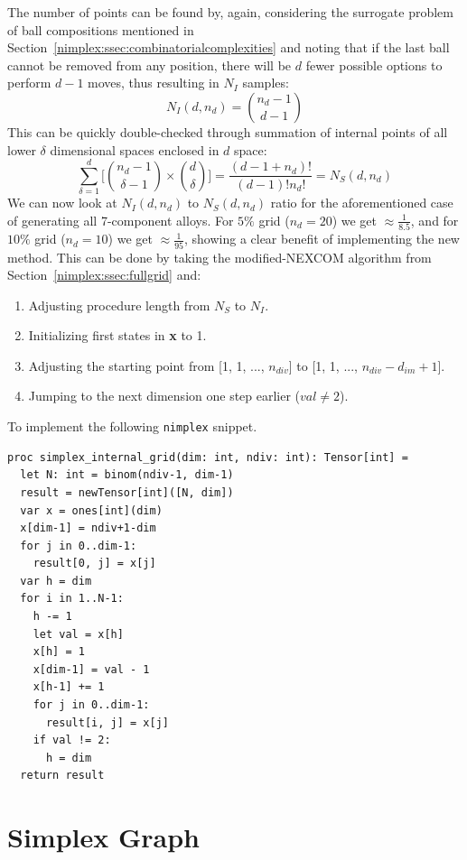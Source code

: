 The number of points can be found by, again, considering the surrogate problem of ball compositions mentioned in Section~\ref{nimplex:ssec:combinatorialcomplexities} and noting that if the last ball cannot be removed from any position, there will be $d$ fewer possible options to perform $d-1$ moves, thus resulting in $N_I$ samples:
\begin{equation}
    N_I(d, n_d) = \binom{n_d-1}{d-1}
\end{equation}
This can be quickly double-checked through summation of internal points of all lower $\delta$ dimensional spaces enclosed in $d$ space:
\[\sum_{\delta=1}^d \Biggl[ \binom{n_d-1}{\delta-1} \times \binom{d}{\delta} \Biggr] =  \frac{(d - 1 + n_d)!}{(d-1)!n_d!} = N_S(d, n_d)\]
We can now look at $N_I(d, n_d)$ to $N_S(d, n_d)$ ratio for the aforementioned case of generating all 7-component alloys. For $5\%$ grid ($n_d=20$) we get $\approx \frac{1}{8.5}$, and for $10\%$ grid ($n_d=10$) we get $\approx \frac{1}{95}$, showing a clear benefit of implementing the new method. This can be done by taking the modified-NEXCOM algorithm \cite{Chasalow1995AlgorithmPoints} from Section~\ref{nimplex:ssec:fullgrid} and:
\begin{enumerate}
    \item Adjusting procedure length from $N_S$ to $N_I$.
    \item Initializing first states in \textbf{x} to 1.
    \item Adjusting the starting point from [1, 1, ..., $n_{div}$] to [1, 1, ..., $n_{div}-d_{im}+1$].
    \item Jumping to the next dimension one step earlier ($val \neq 2$).
\end{enumerate}

To implement the following \texttt{nimplex} snippet.

\begin{verbatim}
proc simplex_internal_grid(dim: int, ndiv: int): Tensor[int] =
  let N: int = binom(ndiv-1, dim-1)
  result = newTensor[int]([N, dim])
  var x = ones[int](dim)
  x[dim-1] = ndiv+1-dim
  for j in 0..dim-1:
    result[0, j] = x[j]
  var h = dim
  for i in 1..N-1:
    h -= 1
    let val = x[h]
    x[h] = 1
    x[dim-1] = val - 1
    x[h-1] += 1
    for j in 0..dim-1:
      result[i, j] = x[j]
    if val != 2:
      h = dim
  return result
\end{verbatim}


\section{Simplex Graph} \label{nimplex:sec:simplexgraph}

